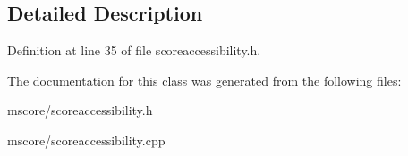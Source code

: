 \subsection{Detailed Description}


Definition at line 35 of file scoreaccessibility.\+h.



The documentation for this class was generated from the following files\+:\begin{DoxyCompactItemize}
\item 
mscore/scoreaccessibility.\+h\item 
mscore/scoreaccessibility.\+cpp\end{DoxyCompactItemize}
